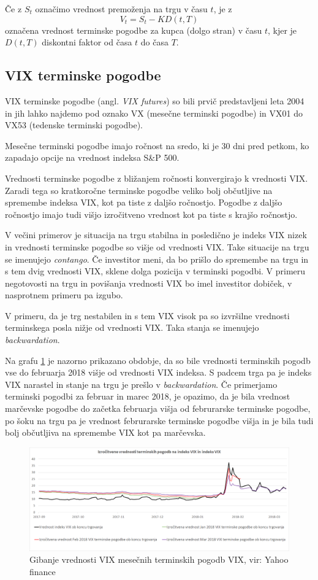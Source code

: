 \documentclass[12pt,a4paper]{amsart}
\theoremstyle{definition} %
\theoremstyle{plain} %
\begin{document}
Če z $S_t$ označimo vrednost premoženja na trgu v času $t$, je z
$$
V_t = S_t - KD(t, T)
$$
označena vrednost terminske pogodbe za kupca (dolgo stran) v času $t$, kjer je $D(t,T)$ diskontni faktor od časa $t$ do časa $T$. 


\subsection{VIX terminske pogodbe}
VIX terminske pogodbe (angl. \textit{VIX futures}) so bili prvič predstavljeni leta 2004 in jih lahko najdemo pod oznako VX (mesečne terminski pogodbe) in VX01 do VX53 (tedenske terminski pogodbe).\

Mesečne terminski pogodbe imajo ročnost na sredo, ki je 30 dni pred petkom, ko zapadajo opcije na vrednost indeksa S\&P 500.\

Vrednosti terminske pogodbe z bližanjem ročnosti konvergirajo k vrednosti VIX. Zaradi tega so kratkoročne terminske pogodbe veliko bolj občutljive na spremembe indeksa VIX, kot pa tiste z daljšo ročnostjo. Pogodbe z daljšo ročnostjo imajo tudi višjo izročitveno vrednost kot pa tiste s krajšo ročnostjo.\

V večini primerov je situacija na trgu stabilna in posledično je indeks VIX nizek in vrednosti terminske pogodbe so višje od vrednosti VIX. Take situacije na trgu se imenujejo \textit{contango}. Če investitor meni, da bo prišlo do spremembe na trgu in s tem dvig vrednosti VIX, sklene dolga pozicija v terminski pogodbi. V primeru negotovosti na trgu in povišanja vrednosti VIX bo imel investitor dobiček, v nasprotnem primeru pa izgubo.\

V primeru, da je trg nestabilen in s tem VIX visok pa so izvršilne vrednosti terminskega posla nižje od vrednosti VIX. Taka stanja se imenujejo \textit{backwardation}.\

Na grafu \ref{Graf 3} je nazorno prikazano obdobje, da so bile vrednosti terminskih pogodb vse do februarja 2018 višje od vrednosti VIX indeksa. S padcem trga pa je indeks VIX narastel in stanje na trgu je prešlo v \textit{backwardation}. Če primerjamo terminski pogodbi za februar in marec 2018, je opazimo, da je bila vrednost marčevske pogodbe do začetka februarja višja od februrarske terminske pogodbe, po šoku na trgu pa je vrednost februrarske terminske pogodbe višja in je bila tudi bolj občutljiva na spremembe VIX kot pa marčevska.
\begin{figure}[!h]
\centering
\includegraphics[width = 15 cm]{Grafi/VIX_futures_2018.png}
\caption{Gibanje vrednosti VIX mesečnih terminskih pogodb VIX, vir: Yahoo finance}
\label{Graf 3}
\end{figure}\
\newpage
\end{document}
